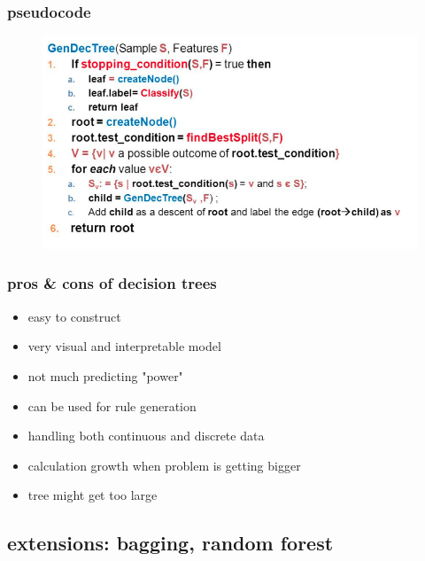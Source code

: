 \documentclass{beamer}
\begin{document}
\begin{frame}
\frametitle{pseudocode}
\begin{figure}
\includegraphics[width = 1\linewidth]{figures/04/01_classification/pseudocode.png}
\end{figure}
\end{frame}

\begin{frame}
\frametitle{pros \& cons of decision trees}
\begin{itemize}
\item easy to construct
\item very visual and interpretable model
\item not much predicting "power"
\item can be used for rule generation 
\item handling both continuous and discrete data
\item calculation growth when problem is getting bigger
\item tree might get too large
\end{itemize}
\end{frame}

\subsection{extensions: bagging, random forest}
\end{document}

